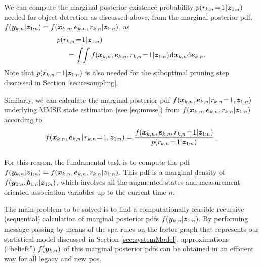 \documentclass[10pt, twoside, romanappendices]{IEEEtran}
\providecommand{\ist}{\hspace*{.3mm}}
\providecommand{\rmv}{\hspace*{-.3mm}}
\providecommand{\nn}{\nonumber}
\begin{document}
We can compute the marginal posterior existence probability $p(r_{k,n} \!=\! 1 \ist | \ist \V{z}_{1:n})$ needed for object detection as discussed above,
from the marginal posterior pdf, $f(\bm{y}_{k,n} | \bm{z}_{1:n}) = f(\bm{x}_{k,n}, \bm{e}_{k,n},  r_{k,n}|\bm{z}_{1:n})$, \vspace{0mm} as
\begin{align}
&p(r_{k,n} \!=\! 1|\V{z}_{1:n}) \nn\\
&\hspace{5mm} = \int \rmv\rmv\rmv \int f(\V{x}_{k,n}, \V{e}_{k,n},  r_{k,n} \!=\! 1 |\V{z}_{1:n}) \ist \mathrm{d}\V{x}_{k,n} \mathrm{d}\V{e}_{k,n}.
\label{eq:margpost_r} \\[-5.5mm]
\nn
\end{align}
Note that $p(r_{k,n} \!=\! 1|\bm{z}_{1:n})$ is also needed for the suboptimal pruning step discussed in Section \ref{sec:resampling}.

Similarly, we can calculate the marginal posterior pdf  $f(\bm{x}_{k,n}, \bm{e}_{k,n} | r_{k,n} \!=\! 1, \bm{z}_{1:n} )$ underlying MMSE state estimation (see \eqref{eq:mmse})
 from $f(\bm{x}_{k,n}, \bm{e}_{k,n}, r_{k,n}|\bm{z}_{1:n})$ according to
\begin{align}
f(\V{x}_{k,n}, \V{e}_{k,n} \ist | \ist r_{k,n} \!=\! 1, \V{z}_{1:n} ) =  \frac{f(\V{x}_{k,n}, \V{e}_{k,n},  r_{k,n} \!=\! 1 |\V{z}_{1:n})}{p(r_{k,n} \!=\! 1|\V{z}_{1:n})} \,. \nn\\[-1.5mm]
\label{eq:margpost_x}\\[-6mm]
\nn
\end{align}
For this reason, the fundamental task is to compute the pdf $f(\bm{y}_{k,n} | \bm{z}_{1:n}) = f(\bm{x}_{k,n}, \bm{e}_{k,n},  r_{k,n}|\bm{z}_{1:n})$. This pdf is a marginal density of $f(\bm{y}_{0:n}, \bm{b}_{1:n} | \bm{z}_{1:n} )$, which involves all the augmented states and measurement-oriented association variables up to the current time $n$.

The main problem to be solved is to find a computationally feasible recursive (sequential) calculation of marginal posterior \acp{pdf} $f(\bm{y}_{k,n} | \bm{z}_{1:n})$. By performing message passing by means of the \ac{spa} rules \cite{KscFreLoe:01} on the factor graph that represents our statistical model discussed in Section \ref{sec:systemModel}, approximations \vspace{0mm} (``beliefs'') $\tilde{f}(\bm{y}_{k,n})$ of this marginal posterior  pdfs  can be obtained in an efficient way for all legacy\vspace{-2mm} and new \acp{po}. 
\end{document}
